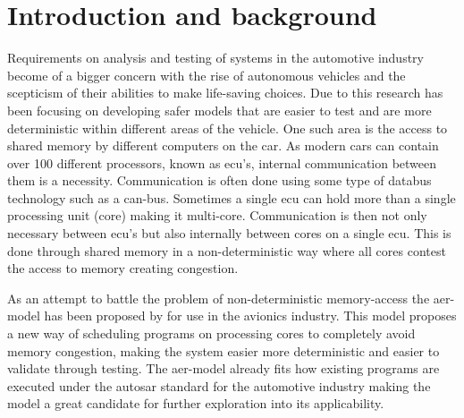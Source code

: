 \documentclass{kththesis}
\begin{document}
\tableofcontents

\mainmatter


\chapter{Introduction and background} 





Requirements on analysis and testing of systems in the automotive industry become of a bigger
concern with the rise of autonomous vehicles and the scepticism of their abilities to make
life-saving choices. Due to this research has been focusing on developing safer models that are
easier to test and are more deterministic within different areas of the vehicle. One such area is
the access to shared memory by different computers on the car. As modern cars can contain over 100
different processors, known as \acrshort{ecu}'s, internal communication between them is a
necessity. Communication is often done using some type of databus technology such as a
\acrshort{can}-bus. Sometimes a single \acrshort{ecu} can hold more than a single processing unit
(core) making it multi-core. Communication is then not only necessary between \acrshort{ecu}'s but
also internally between cores on a single \acrshort{ecu}. This is done through shared memory in a
non-deterministic way where all cores contest the access to memory creating congestion.


As an attempt to battle the problem of non-deterministic memory-access the \acrshort{aer}-model has
been proposed by \textcite{durrieu_predictable_2014} for use in the avionics industry. This model
proposes a new way of scheduling programs on processing cores to completely avoid memory
congestion, making the system easier more deterministic and easier to validate through testing. The
\acrshort{aer}-model already fits how existing programs are executed under the \acrshort{autosar}
standard for the automotive industry making the model a great candidate for further exploration into
its applicability.

\end{document}
